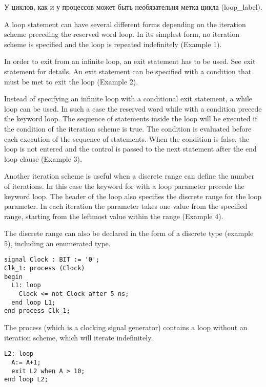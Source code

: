 У циклов, как и у процессов может быть необязательня метка цикла (loop\_label).

A loop statement can have several different forms depending on the iteration scheme preceding the reserved word loop. In its simplest form, no iteration scheme is specified and the loop is repeated indefinitely (Example 1).

In order to exit from an infinite loop, an exit statement has to be used. See exit statement for details. An exit statement can be specified with a condition that must be met to exit the loop (Example 2).

Instead of specifying an infinite loop with a conditional exit statement, a while loop can be used. In such a case the reserved word while with a condition precede the keyword loop. The sequence of statements inside the loop will be executed if the condition of the iteration scheme is true. The condition is evaluated before each execution of the sequence of statements. When the condition is false, the loop is not entered and the control is passed to the next statement after the end loop clause (Example 3).

Another iteration scheme is useful when a discrete range can define the number of iterations. In this case the keyword for with a loop parameter precede the keyword loop. The header of the loop also specifies the discrete range for the loop parameter. In each iteration the parameter takes one value from the specified range, starting from the leftmost value within the range (Example 4).

The discrete range can also be declared in the form of a discrete type (example 5), including an enumerated type.


\begin{Code}
\begin{lstlisting}[caption=Синтаксис циклов, label=loop_1]
signal Clock : BIT := '0';
Clk_1: process (Clock)
begin
  L1: loop
    Clock <= not Clock after 5 ns;
  end loop L1;
end process Clk_1;
\end{lstlisting}
\end{Code}

The process (which is a clocking signal generator) contains a loop without an iteration scheme, which will iterate indefinitely.


\begin{Code}
\begin{lstlisting}[caption=Синтаксис циклов, label=loop_2]
L2: loop
  A:= A+1;
  exit L2 when A > 10;
end loop L2;
\end{lstlisting}
\end{Code}


